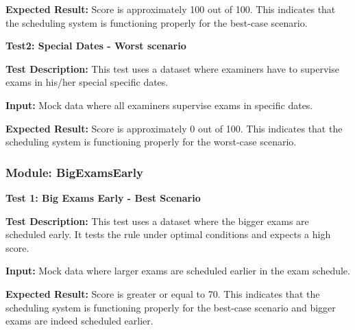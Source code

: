 \vspace{\baselineskip}

\textbf{Expected Result:}
Score is approximately 100 out of 100. This indicates that the scheduling
system is functioning properly for the best-case scenario.


\vspace{\baselineskip}


 
\textbf{Test2: Special Dates - Worst scenario}


\vspace{\baselineskip}

 
 \textbf{Test Description:}
 This test uses a dataset where examiners have to supervise exams in
his/her special specific dates.


\vspace{\baselineskip}

\textbf{Input:}
Mock data where all examiners supervise exams in specific dates.


\vspace{\baselineskip}

 
 \textbf{Expected Result:}
 Score is approximately 0 out of 100. This indicates that the scheduling
system is functioning properly for the worst-case scenario.


\vspace{\baselineskip}



 \subsubsection{Module: BigExamsEarly}

 
\vspace{\baselineskip}

 
 \textbf{Test 1: Big Exams Early - Best Scenario}


\vspace{\baselineskip}

 
 \textbf{Test Description:}
 This test uses a dataset where the bigger exams are scheduled early. It tests
the rule under optimal conditions and expects a high score.


\vspace{\baselineskip}


 \textbf{Input:}
 Mock data where larger exams are scheduled earlier in the exam schedule.


\vspace{\baselineskip}

 
 \textbf{Expected Result:}
 Score is greater or equal to 70. This indicates that the scheduling system is
functioning properly for the best-case scenario and bigger exams are indeed scheduled earlier.


